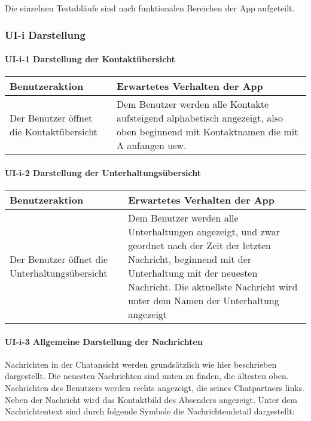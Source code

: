 
Die einzelnen Testabläufe sind nach funktionalen Bereichen der App
aufgeteilt.



\subsubsection{UI-i Darstellung}

\paragraph{UI-i-1 Darstellung der Kontaktübersicht}

\begin{longtable}{|p{8cm}|p{8.5cm}|}
\hline
Benutzeraktion & Erwartetes Verhalten der App\tabularnewline
\hline

Der Benutzer öffnet die Kontaktübersicht & Dem Benutzer werden alle
Kontakte aufsteigend alphabetisch angezeigt, also oben beginnend mit
Kontaktnamen die mit A anfangen usw.\tabularnewline
\hline
\end{longtable}

\paragraph{UI-i-2 Darstellung der Unterhaltungsübersicht}

\begin{longtable}{|p{8cm}|p{8.5cm}|}
\hline
Benutzeraktion & Erwartetes Verhalten der App\tabularnewline
\hline

Der Benutzer öffnet die Unterhaltungsübersicht & Dem Benutzer werden
alle Unterhaltungen angezeigt, und zwar geordnet nach der Zeit der
letzten Nachricht, beginnend mit der Unterhaltung mit der neuesten
Nachricht. Die aktuellste Nachricht wird unter dem Namen der
Unterhaltung angezeigt\tabularnewline
\hline
\end{longtable}


\paragraph{UI-i-3 Allgemeine Darstellung der Nachrichten}

Nachrichten in der Chatansicht werden grundsätzlich wie hier beschrieben dargestellt. Die neuesten Nachrichten sind unten zu finden, die ältesten oben. Nachrichten des Benutzers werden rechts angezeigt, die seines Chatpartners links. Neben der Nachricht wird das Kontaktbild des Absenders angezeigt. Unter dem Nachrichtentext sind durch folgende Symbole die Nachrichtendetail dargestellt:

